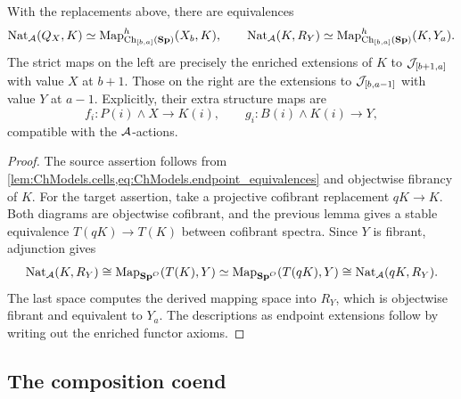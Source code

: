 \begin{prop}\label{prop:ChModels.endpoint_maps}\label{cor:ch_to_morph}
    With the replacements above, there are equivalences
    \[
        \operatorname{Nat}_{\mathcal{A}}(Q_X,K)
        \simeq\operatorname{Map}^h_{\operatorname{Ch}_{[b,a]}(\mathbf{Sp})}(X_b,K),
        \qquad
        \operatorname{Nat}_{\mathcal{A}}(K,R_Y)
        \simeq\operatorname{Map}^h_{\operatorname{Ch}_{[b,a]}(\mathbf{Sp})}(K,Y_a).
    \]
    The strict maps on the left are precisely the enriched extensions of $K$ to $\mathcal{J}_{[b+1,a]}$ with value $X$ at $b+1$. Those on the right are the extensions to $\mathcal{J}_{[b,a-1]}$ with value $Y$ at $a-1$. Explicitly, their extra structure maps are
    \[
        f_i:P(i)\wedge X\longrightarrow K(i),
        \qquad
        g_i:B(i)\wedge K(i)\longrightarrow Y,
    \]
    compatible with the $\mathcal{A}$-actions.
\end{prop}
\begin{proof}
    The source assertion follows from \cref{lem:ChModels.cells,eq:ChModels.endpoint_equivalences} and objectwise fibrancy of $K$. For the target assertion, take a projective cofibrant replacement $qK\to K$. Both diagrams are objectwise cofibrant, and the previous lemma gives a stable equivalence $T(qK)\to T(K)$ between cofibrant spectra. Since $Y$ is fibrant, adjunction gives
    \[
        \operatorname{Nat}_{\mathcal{A}}(K,R_Y)
        \cong\operatorname{Map}_{\mathbf{Sp}^O}(T(K),Y)
        \simeq\operatorname{Map}_{\mathbf{Sp}^O}(T(qK),Y)
        \cong\operatorname{Nat}_{\mathcal{A}}(qK,R_Y).
    \]
    The last space computes the derived mapping space into $R_Y$, which is objectwise fibrant and equivalent to $Y_a$. The descriptions as endpoint extensions follow by writing out the enriched functor axioms.
\end{proof}

\subsection{The composition coend}\label{sec:ChModels.coend}

